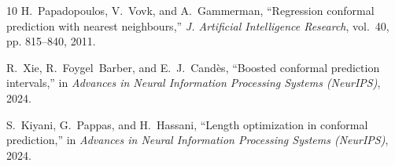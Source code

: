 \documentclass[10pt,twocolumn,a4paper]{article}
\begin{document}
\begin{thebibliography}{10}
H.~Papadopoulos, V.~Vovk, and A.~Gammerman, ``Regression conformal prediction with nearest
neighbours,'' \emph{J. Artificial Intelligence Research}, vol.~40, pp. 815--840, 2011.

R.~Xie, R.~Foygel~Barber, and E.~J.~Cand\`es, ``Boosted conformal prediction intervals,'' in
\emph{Advances in Neural Information Processing Systems (NeurIPS)}, 2024.

S.~Kiyani, G.~Pappas, and H.~Hassani, ``Length optimization in conformal prediction,'' in
\emph{Advances in Neural Information Processing Systems (NeurIPS)}, 2024.

\end{thebibliography}
\end{document}

